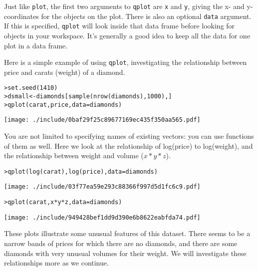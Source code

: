 Just like {\tt plot}, the first two arguments to {\tt qplot} are {\tt x} and {\tt y}, giving the x- and y-coordinates for the objects on the plot. There is also an optional {\tt data} argument.  If this is specified, {\tt qplot} will look inside that data frame before looking for objects in your workspace.  It's generally a good idea to keep all the data for one plot in a data frame.

Here is a simple example of using {\tt qplot}, investigating the relationship between price and carats (weight) of a diamond.  

\begin{alltt}
> set.seed(1410)
> dsmall <- diamonds[sample(nrow(diamonds), 1000), ]
> qplot(carat, price, data = diamonds)
\end{alltt}
\texttt{[image: ./include/0baf29f25c89677169ec435f350aa565.pdf]}
\begin{alltt}

\end{alltt}

You are not limited to specifying names of existing vectors: you can use functions of them as well.  Here we look at the relationship of log(price) to log(weight), and the relationship between weight and volume ($x * y * z$).

\begin{alltt}
> qplot(log(carat), log(price), data = diamonds)
\end{alltt}
\texttt{[image: ./include/03f77ea59e293c88366f997d5d1fc6c9.pdf]}
\begin{alltt}

> qplot(carat, x * y * z, data = diamonds)
\end{alltt}
\texttt{[image: ./include/949428bef1dd9d390e6b8622eabfda74.pdf]}
\begin{alltt}

\end{alltt}

These plots illustrate some unusual features of this dataset.  There seems to be a narrow bands of prices for which there are no diamonds, and there are some diamonds with very unusual volumes for their weight.  We will investigate these relationships more as we continue.


